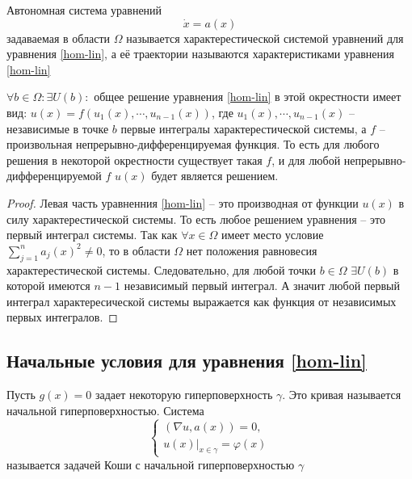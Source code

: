 \documentclass[document.tex]{subfiles}
\begin{document}
\begin{definition}
    Автономная система уравнений
    \[
        \dot x = a(x)
    \] задаваемая в области $\Omega$ называется характерестической системой уравнений для уравнения \ref{hom-lin}, а её
    траектории называются характеристиками уравнения \ref{hom-lin}
\end{definition}

\begin{theorem}
    $\forall b \in \Omega: \exists U(b):$ общее решение уравнения \ref{hom-lin} в этой окрестности имеет вид: $u(x) =
    f(u_1(x), \cdots, u_{n - 1}(x))$, где $u_1(x), \cdots, u_{n - 1}(x)$ -- независимые в точке $b$ первые интегралы
    характерестической системы, а $f$ -- произвольная непрерывно-дифференцируемая функция. То есть для любого решения в
    некоторой окрестности существует такая $f$, и для любой непрерывно-дифференцируемой $f$ $u(x)$ будет является
    решением.
\end{theorem}
\begin{proof}
    Левая часть уравненния \ref{hom-lin} -- это производная от функции $u(x)$ в силу характерестической системы. То есть
    любое решением уравнения -- это первый интеграл системы. Так как $\forall x \in \Omega$ имеет место условие $\sum_{j
    = 1}^{n}a_j(x)^2 \neq 0$, то в области $\Omega$ нет положения равновесия характерестической системы. Следовательно,
    для любой точки $b \in \Omega$ $\exists U(b)$ в которой имеются $n - 1$ независимый первый интеграл. А значит любой
    первый интеграл характересической системы выражается как функция от независимых первых интегралов.
\end{proof}

\subsection{Начальные условия для уравнения \ref{hom-lin}}

\begin{definition}
    Пусть $g(x) = 0$ задает некоторую гиперповерхность $\gamma$. Это кривая называется начальной гиперповерхностью.
    Система
    \begin{equation}
        \label{cauchy_part}
        \begin{cases}
            (\nabla u, a(x)) = 0, \\
            u(x) \Big|_{x \in \gamma} = \varphi(x)
        \end{cases}
    \end{equation} 
    называется задачей Коши с начальной гиперповерхностью $\gamma$
\end{definition}
\end{document}
